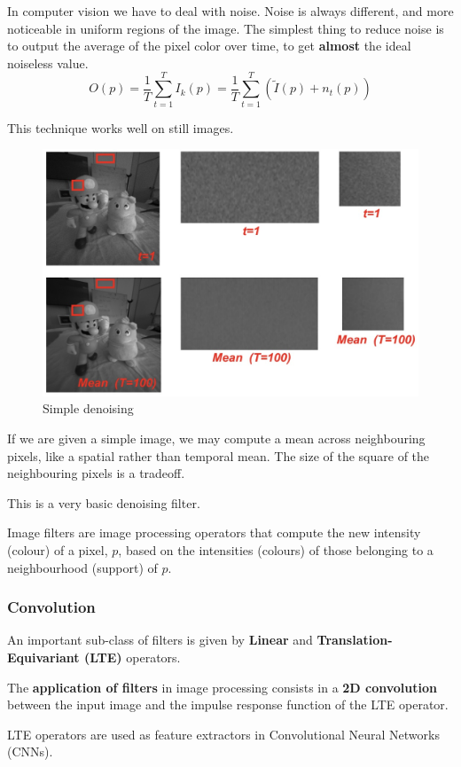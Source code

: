 In computer vision we have to deal with noise.
Noise is always different, and more noticeable in uniform regions of the image.
The simplest thing to reduce noise is to output the average of the pixel color over time, to get \textbf{almost} the ideal noiseless value.
$$O(p) = \frac{1}{T} \sum_{t=1}^{T} I_k(p) = \frac{1}{T} \sum_{t=1}^{T}(\tilde{I}(p) + n_t(p))$$

This technique works well on still images.

\begin{figure}[htbp]
  \centering
  \includegraphics[width=0.7\linewidth]{./img/denoising_simple.jpg}
  \caption{Simple denoising}
  \label{fig:denoising_simple}
\end{figure}

If we are given a simple image, we may compute a mean across neighbouring pixels, like a spatial rather than temporal mean.
The size of the square of the neighbouring pixels is a tradeoff.

This is a very basic denoising filter.

Image filters are image processing operators that compute the new intensity (colour) of a pixel, $p$, based on the intensities (colours) of those belonging to a neighbourhood (support) of $p$.

\subsubsection{Convolution}

An important sub-class of filters is given by \textbf{Linear} and \textbf{Translation-Equivariant (LTE)} operators.

The \textbf{application of filters} in image processing consists in a \textbf{2D convolution} between the input image and the impulse response function of the LTE operator.

LTE operators are used as feature extractors in Convolutional Neural Networks (CNNs).

